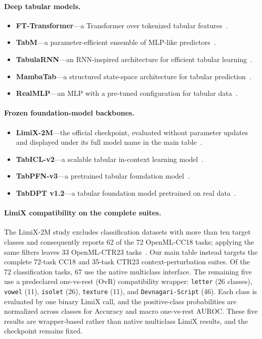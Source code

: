 \paragraph{Deep tabular models.}
\begin{itemize}
  \setlength{\itemsep}{1pt}
  \setlength{\parskip}{0pt}
  \item \textbf{FT-Transformer}---a Transformer over tokenized tabular
  features~\citep{gorishniy2021fttransformer}.
  \item \textbf{TabM}---a parameter-efficient ensemble of MLP-like
  predictors~\citep{gorishniy2025tabm}.
  \item \textbf{TabulaRNN}---an RNN-inspired architecture for efficient
  tabular learning~\citep{thielmann2024tabularnn}.
  \item \textbf{MambaTab}---a structured state-space architecture for tabular
  prediction~\citep{ahamed2024mambatab}.
  \item \textbf{RealMLP}---an MLP with a pre-tuned configuration for tabular
  data~\citep{holzmueller2024realmlp}.
\end{itemize}

\paragraph{Frozen foundation-model backbones.}
\begin{itemize}
  \setlength{\itemsep}{1pt}
  \setlength{\parskip}{0pt}
  \item \textbf{LimiX-2M}---the official checkpoint, evaluated without
  parameter updates and displayed under its full model name in the main
  table~\citep{wang2026limix2m}.
  \item \textbf{TabICL-v2}---a scalable tabular in-context learning
  model~\citep{qu2026tabiclv2}.
  \item \textbf{TabPFN-v3}---a pretrained tabular foundation
  model~\citep{grinsztajn2026tabpfn3technicalreport}.
  \item \textbf{TabDPT v1.2}---a tabular foundation model pretrained on real
  data~\citep{ma2025tabdpt}.
\end{itemize}

\paragraph{LimiX compatibility on the complete suites.}
The LimiX-2M study excludes classification datasets with more than ten target
classes and consequently reports 62 of the 72 OpenML-CC18 tasks; applying the
same filters leaves 33 OpenML-CTR23 tasks~\citep{wang2026limix2m}.  Our main
table instead targets the complete 72-task CC18 and 35-task CTR23
context-perturbation suites.  Of the 72 classification tasks, 67 use the native
multiclass interface.  The remaining five use a predeclared one-vs-rest (OvR)
compatibility wrapper: \texttt{letter} (26 classes), \texttt{vowel} (11),
\texttt{isolet} (26), \texttt{texture} (11), and
\texttt{Devnagari-Script} (46).  Each class is evaluated by one binary LimiX
call, and the positive-class probabilities are normalized across classes for
Accuracy and macro one-vs-rest AUROC.  These five results are wrapper-based
rather than native multiclass LimiX results, and the checkpoint remains fixed.

